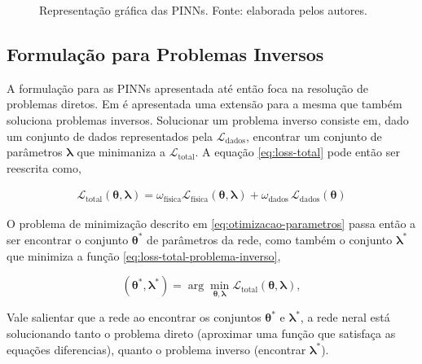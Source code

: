 \begin{figure}[htpb]
\caption{Representação gráfica das PINNs. Fonte: elaborada pelos autores.}
\label{fig:pinn-representacao-grafica}
\end{figure}

\subsection{Formulação para Problemas Inversos}

A formulação para as PINNs apresentada até então foca na resolução de problemas
diretos. Em \cite{raissi-etal:19} é apresentada uma extensão para a mesma que 
também soluciona problemas inversos. Solucionar um problema inverso consiste em,
dado um conjunto de dados representados pela $\mathcal{L}_{\text{dados}}$,
encontrar um conjunto de parâmetros $\boldsymbol{\lambda}$ que minimaniza a
$\mathcal{L}_{\text{total}}$.
A equação \ref{eq:loss-total} pode então ser reescrita como,

\begin{eqnarray}\label{eq:loss-total-problema-inverso} 
    \mathcal{L}_{\text{total}}(\boldsymbol{\theta}, \boldsymbol{\lambda}) 
    = \omega_{\text{física}} \mathcal{L}_{\text{física}}(\boldsymbol{\theta}, \boldsymbol{\lambda}) 
    + \omega_{\text{dados}} \,\mathcal{L}_{\text{dados}}(\boldsymbol{\theta})
\end{eqnarray}

O problema de minimização descrito em \ref{eq:otimizacao-parametros} passa 
então a ser encontrar o conjunto $\boldsymbol{\theta}^*$ de parâmetros da rede,
como também o conjunto $\boldsymbol{\lambda}^*$
que minimiza a função \ref{eq:loss-total-problema-inverso}, 

\begin{equation}\label{eq:otimizacao-parametros-problema-inverso}
   (\boldsymbol{\theta}^*, \boldsymbol{\lambda}^*) 
   = \arg \min_{\boldsymbol{\theta}, \boldsymbol{\lambda}} \mathcal{L}_{\text{total}}(\boldsymbol{\theta}, \boldsymbol{\lambda}), 
\end{equation}

Vale salientar que a rede ao encontrar os conjuntos $\boldsymbol{\theta}^*$
e $\boldsymbol{\lambda}^*$, a rede neral está solucionando tanto o problema
direto (aproximar uma função que satisfaça as equações diferencias), quanto o 
problema inverso (encontrar $\boldsymbol{\lambda}^*$). 

